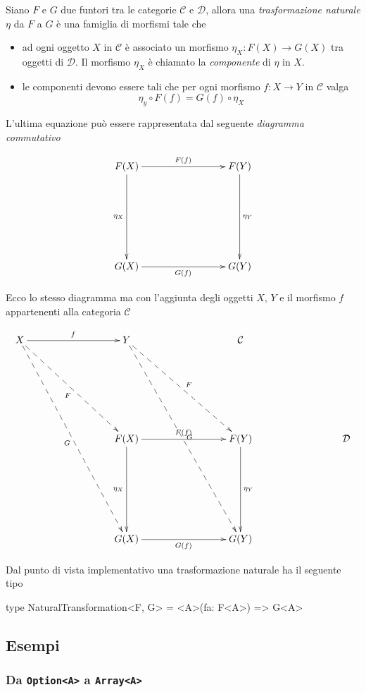 \documentclass[12pt]{article}
\theoremstyle{definition}
\newenvironment{code}
  {\vspace{0.5cm} \VerbatimEnvironment\begin{typescriptcode}}
  {\end{typescriptcode} \vspace{0.2cm}}
\begin{document}
Siano $F$ e $G$ due funtori tra le categorie $\mathcal{C}$ e $\mathcal{D}$, allora una \emph{trasformazione naturale} $\eta$ da $F$ a $G$
è una famiglia di morfismi tale che

\begin{itemize}
\item ad ogni oggetto $X$ in $\mathcal{C}$ è associato un morfismo $\eta_X: F(X) \rightarrow G(X)$ tra oggetti di $\mathcal{D}$.
Il morfismo $\eta_X$ è chiamato la \emph{componente} di $\eta$ in $X$.
\item le componenti devono essere tali che per ogni morfismo $f: X \rightarrow Y$ in $\mathcal{C}$ valga
$$
\eta_y \circ F(f) = G(f) \circ \eta_X
$$
\end{itemize}

L'ultima equazione può essere rappresentata dal seguente \emph{diagramma commutativo}

\[
\xymatrixrowsep{3cm}
\xymatrixcolsep{3cm}
\xymatrix{
  F(X) \ar[r]^{F(f)} \ar[d]_{\eta_X} & F(Y) \ar[d]^{\eta_Y} \\
  G(X) \ar[r]_{G(f)} & G(Y) \\
}
\]

Ecco lo stesso diagramma ma con l'aggiunta degli oggetti $X$, $Y$ e il morfismo $f$ appartenenti alla categoria $\mathcal{C}$

\[
\xymatrixrowsep{3cm}
\xymatrixcolsep{3cm}
\xymatrix{
  X \ar@{-->}[rd]_{F} \ar@{-->}[rdd]_{G} \ar[r]^{f} & Y \ar@{-->}[rd]^{F} \ar@{-->}[rdd]^{G} & \mathcal{C} \\
  & F(X) \ar[r]^{F(f)} \ar[d]_{\eta_X} & F(Y) \ar[d]^{\eta_Y} & \mathcal{D} \\
  & G(X) \ar[r]_{G(f)} & G(Y) \\
}
\]

Dal punto di vista implementativo una trasformazione naturale ha il seguente tipo

\begin{code}
type NaturalTransformation<F, G> = <A>(fa: F<A>) => G<A>
\end{code}

\subsection{Esempi}

\subsubsection{Da \texttt{Option<A>} a \texttt{Array<A>}}
\end{document}
